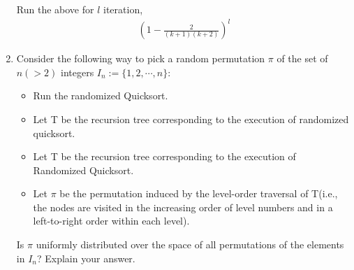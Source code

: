 \documentclass{article}
\begin{document}
\begin{enumerate}
    Run the above for $l$ iteration,
    \begin{align*}
        \left(1-\frac{2}{(k+1)(k+2)} \right)^l 
    \end{align*}
    \item Consider the following way to pick a random permutation $\pi$ of the set of $n(>2)$ integers $I_n:= \{1,2,\cdots,n\}$:
    \begin{itemize}
        \item Run the randomized Quicksort.
        \item Let T be the recursion tree corresponding to the execution of randomized quicksort.
        \item Let T be the recursion tree corresponding to the execution of Randomized Quicksort. 
        \item Let $\pi$ be the permutation induced by the level-order traversal of T(i.e., the nodes are visited in the increasing order of level numbers and in a left-to-right order within each level).
    \end{itemize}
    Is $\pi$ uniformly distributed over the space of all permutations of the elements in $I_n$? Explain your answer.
\end{enumerate}
\end{document}
